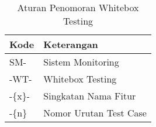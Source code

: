 \begin{table}[!h]
    \caption{Aturan Penomoran Whitebox Testing}
    \centering
    \begin{tabular}
        {
            >{\centering\arraybackslash}p{}
            >{\centering\arraybackslash}p{}
        }
        \toprule

        Kode &
        Keterangan \\ [1ex]

        \midrule

        SM- & Sistem Monitoring \\
        -WT- & Whitebox Testing \\
        -\{x\}- & Singkatan Nama Fitur \\
        -\{n\} & Nomor Urutan Test Case \\

        \bottomrule
    \end{tabular}
    \label{tab:nr-whitebox}
\end{table}